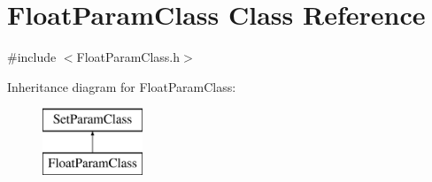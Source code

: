 \hypertarget{class_float_param_class}{}\section{Float\+Param\+Class Class Reference}
\label{class_float_param_class}


{\ttfamily \#include $<$Float\+Param\+Class.\+h$>$}

Inheritance diagram for Float\+Param\+Class\+:\begin{figure}[H]
\begin{center}
\leavevmode
\includegraphics[height=2.000000cm]{class_float_param_class}
\end{center}
\end{figure}
